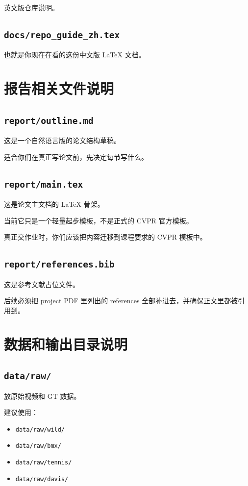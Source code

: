 \documentclass[11pt,a4paper,fontset=none]{ctexart}
\begin{document}
英文版仓库说明。

\subsection{\texttt{docs/repo\_guide\_zh.tex}}

也就是你现在在看的这份中文版 LaTeX 文档。

\section{报告相关文件说明}

\subsection{\texttt{report/outline.md}}

这是一个自然语言版的论文结构草稿。

适合你们在真正写论文前，先决定每节写什么。

\subsection{\texttt{report/main.tex}}

这是论文主文档的 LaTeX 骨架。

当前它只是一个轻量起步模板，不是正式的 CVPR 官方模板。

真正交作业时，你们应该把内容迁移到课程要求的 CVPR 模板中。

\subsection{\texttt{report/references.bib}}

这是参考文献占位文件。

后续必须把 project PDF 里列出的 references 全部补进去，并确保正文里都被引用到。

\section{数据和输出目录说明}

\subsection{\texttt{data/raw/}}

放原始视频和 GT 数据。

建议使用：

\begin{itemize}
  \item \texttt{data/raw/wild/}
  \item \texttt{data/raw/bmx/}
  \item \texttt{data/raw/tennis/}
  \item \texttt{data/raw/davis/}
\end{itemize}
\end{document}
